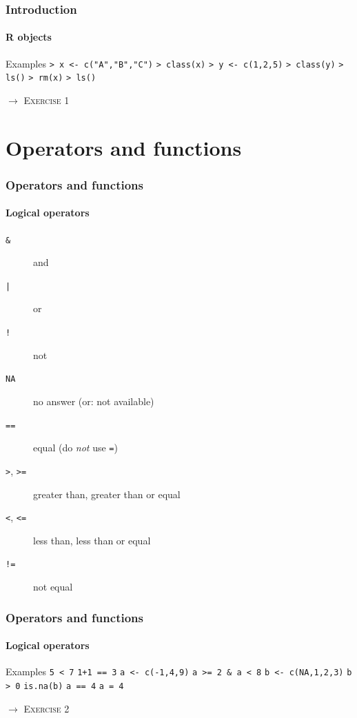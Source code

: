 \documentclass[title={Introduction to R}, author={Mutschler and Zaharieva}, inst={Institute for Econometrics and Empirical Economics}]{beamer}
\begin{document}
\begin{frame}
\frametitle{Introduction}
\framesubtitle{R objects}
\begin{block}{Examples}
\texttt{> x <- c("A","B","C")}\newline
\texttt{> class(x)}\newline
\texttt{> y <- c(1,2,5)}\newline
\texttt{> class(y)}\newline
\texttt{> ls()}\newline
\texttt{> rm(x)}\newline
\texttt{> ls()}
\end{block}\pause
$\longrightarrow $ \textsc{Exercise 1}
\end{frame}


\section{Operators and functions}

\begin{frame}
\frametitle{Operators and functions}
\framesubtitle{Logical operators}
\begin{description}
\item[\texttt{\&}] and
\item[\texttt{|}] or
\item[\texttt{!}] not
\item[\texttt{NA}] no answer (or: not available)
\item[\texttt{==}] equal (do \emph{not} use \texttt{=})
\item[\texttt{>}, \texttt{>=}] greater than,
greater than or equal
\item[\texttt{<}, \texttt{<=}] less than, less
than or equal
\item[\texttt{!=}] not equal
\end{description}
\end{frame}


\begin{frame}
\frametitle{Operators and functions}
\framesubtitle{Logical operators}
\begin{block}{Examples}
\texttt{5 < 7}\newline
\texttt{1+1 == 3}\newline
\texttt{a <- c(-1,4,9)}\newline
\texttt{a >= 2 \& a < 8}\newline
\texttt{b <- c(NA,1,2,3)}\newline
\texttt{b > 0}\newline
\texttt{is.na(b)}\newline
\texttt{a == 4}\newline
\texttt{a = 4}
\end{block}\pause
$\longrightarrow $ \textsc{Exercise 2}
\end{frame}
\end{document}
